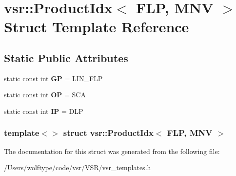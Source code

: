 \hypertarget{structvsr_1_1_product_idx_3_01_f_l_p_00_01_m_n_v_01_4}{\section{vsr\-:\-:Product\-Idx$<$ F\-L\-P, M\-N\-V $>$ Struct Template Reference}
\label{structvsr_1_1_product_idx_3_01_f_l_p_00_01_m_n_v_01_4}
}
\subsection*{Static Public Attributes}
\begin{DoxyCompactItemize}
\item 
\hypertarget{structvsr_1_1_product_idx_3_01_f_l_p_00_01_m_n_v_01_4_a29a9ca4a0dafb7e87312736a2b6bac01}{static const int {\bfseries G\-P} = L\-I\-N\-\_\-\-F\-L\-P}\label{structvsr_1_1_product_idx_3_01_f_l_p_00_01_m_n_v_01_4_a29a9ca4a0dafb7e87312736a2b6bac01}

\item 
\hypertarget{structvsr_1_1_product_idx_3_01_f_l_p_00_01_m_n_v_01_4_a9aed3e7a907f80249f8543127b6f96c9}{static const int {\bfseries O\-P} = S\-C\-A}\label{structvsr_1_1_product_idx_3_01_f_l_p_00_01_m_n_v_01_4_a9aed3e7a907f80249f8543127b6f96c9}

\item 
\hypertarget{structvsr_1_1_product_idx_3_01_f_l_p_00_01_m_n_v_01_4_a75565f1455b4546f5b49b91b412d578e}{static const int {\bfseries I\-P} = D\-L\-P}\label{structvsr_1_1_product_idx_3_01_f_l_p_00_01_m_n_v_01_4_a75565f1455b4546f5b49b91b412d578e}

\end{DoxyCompactItemize}
\subsubsection*{template$<$$>$ struct vsr\-::\-Product\-Idx$<$ F\-L\-P, M\-N\-V $>$}



The documentation for this struct was generated from the following file\-:\begin{DoxyCompactItemize}
\item 
/\-Users/wolftype/code/vsr/\-V\-S\-R/vsr\-\_\-templates.\-h\end{DoxyCompactItemize}
